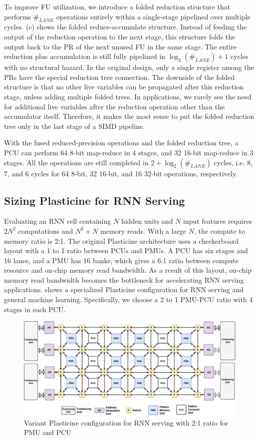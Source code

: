 To improve FU utilization, we introduce a folded reduction structure that performs $\#_{LANE}$
operations entirely within a single-stage pipelined over multiple cycles.
 (c) shows the folded reduce-accumulate structure.
Instead of feeding the output of the reduction operation to the next stage, 
this structure folds the output back to the PR of the next unused FU in the same stage. 
The entire reduction plus accumulation is still fully pipelined in $\log_2(\#_{LANE})+1$ cycles
with no structural hazard.
In the original design, only a single register among the PRs have the special reduction tree
connection.
The downside of the folded structure is that no other live variables can be propagated after this
reduction stage, unless adding multiple folded trees. 
In applications, we rarely see the need for additional live variables after the reduction operation
other than the accumulator itself.
Therefore, it makes the most sense to put the
folded reduction tree only in the last stage of a SIMD pipeline.

With the fused reduced-precision operations and the folded reduction tree,
  a PCU can perform 64 8-bit map-reduce in 4 stages, and 32 16-bit map-reduce in 3 stages.
All the operations are still completed in $2+\log_2(\#_{LANE})$ cycles, i.e. 
8, 7, and 6 cycles for 64 8-bit, 32 16-bit, and 16 32-bit operations, respectively.

\subsection{Sizing Plasticine for RNN Serving} \label{sec:sizing}
Evaluating an RNN cell containing $N$ hidden units and $N$ input features
  requires $2N^2$ computations and $N^2+N$ memory reads.
With a large $N$, the compute to memory ratio is 2:1.
The original Plasticine architecture uses a checkerboard layout
  with a 1 to 1 ratio between PCUs and PMUs.
A PCU has six stages and 16 lanes, and a PMU has 16 banks, which gives a 6:1 ratio between
  compute resource and on-chip memory read bandwidth.
As a result of this layout,
  on-chip memory read bandwidth becomes the bottleneck for accelerating RNN serving applications.
 shows a specialized Plasticine configuration for RNN serving and general machine
learning.
Specifically, we choose a 2 to 1 PMU-PCU ratio with 4 stages in each PCU.
\begin{figure}
  \centering
  \includegraphics[width=\textwidth]{figs/rnnarch.pdf}
  \caption[Variant Plasticine configuration for RNN serving]{
    Variant Plasticine configuration for RNN serving with 2:1 ratio for PMU and PCU}
  \label{fig:rnnarch}
\end{figure}
